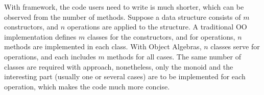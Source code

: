 With \name framework, the code users need to write is much shorter, which can be observed from the number of methods. Suppose a data structure consists of $m$ constructors, and $n$ operations are applied to the structure. A traditional OO implementation defines $m$ classes for the constructors, and for operations, $n$ methods are implemented in each class. With Object Algebras, $n$ classes serve for operations, and each includes $m$ methods for all cases. The same number of classes are required with \name approach, nonetheless, only the monoid and the interesting part (usually one or several cases) are to be implemented for each operation, which makes the code much more concise.
\begin{comment}
Another advantage of \name is that it is quite easy to extend with new
types of traversals.
\bruno{Say something about this}

\tijs{It's this many SLOC:  885}
\bruno{Should we talk about code size? How big is the \name framework?}
\end{comment}
\begin{comment}
To address this problem, we provide a framework \name, which utilizes \emph{Java Annotation} to generate query and transformation interfaces based on the \emph{Object Algebra Interface}. For the below code:
\begin{lstlisting}[numbers=none]
@Algebra
public interface ExpAlg<Exp> {
	Exp Var(String s);
	Exp Lit(int i);
	Exp Add(Exp e1, Exp e2);
}
\end{lstlisting}
with the annotation "$@$Algebra", the framework will generate the boilerplate codes for us automatically. As for our ExpAlg example, the following directory structure will be generated by the library.

\dirtree{%
 .1 src/.
 .2 query/.
 .3 ExpAlgQuery.
 .3 G\_ExpAlgQuery.
 .2 transform/.
 .3 ExpAlgTransform.
 .3 G\_ExpAlgTransform.
}

Here the automatically generated ExpAlgQuery, G\_ExpAlgQuery, ExpAlgTransform and G\_ExpAlgTransform are exactly the same code as we discussed in the previous sections. Developers can implement interesting methods by inheriting from these generic classes without worrying about the traversing work.


With our framework \name, when programming with query and
transformations, the programmer can skip the intermediate steps such
as constructing generic queries and transformations, but only focus on
rewriting the interesting cases. For instance, in our ExpAlg example,
to implement FreeVars algebra, we can simply override the
\lstinline{Exp Var(String s)} method of \lstinline{class ExpAlgQuery}
to return variable name, and provide the specific monoid needed, which
in this case will be a \lstinline{StringListMonoid}. While the
SubstVars algebra can be realized by overriding the \lstinline{Exp
  Var(String s)} method of ExpAlgTransform interface, which
substitutes variable names as specified.
\end{comment}
